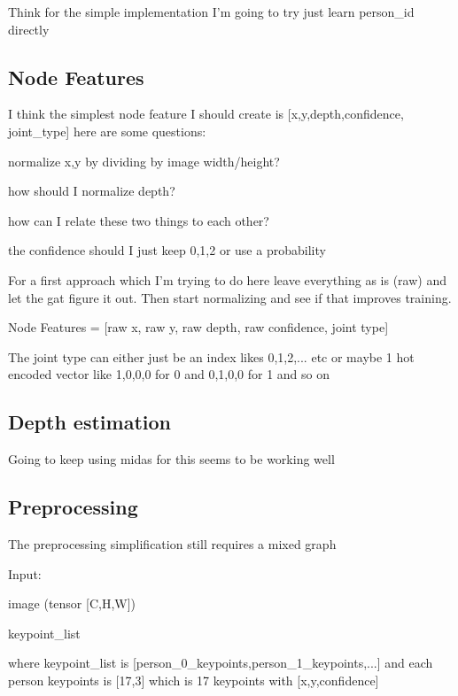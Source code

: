 Think for the simple implementation I'm going to try just learn person\_id directly

\subsection{Node Features}

I think the simplest node feature I should create is [x,y,depth,confidence, joint\_type] here are some questions:

\begin{compactitem}
	\item normalize x,y by dividing by image width/height?
	\item how should I normalize depth? 
	\item how can I relate these two things to each other? 
	\item the confidence should I just keep 0,1,2 or use a probability
\end{compactitem}

For a first approach which I'm trying to do here leave everything as is (raw) and let the gat figure it out.
Then start normalizing and see if that improves training.

Node Features = [raw x, raw y, raw depth, raw confidence, joint type]

The joint type can either just be an index likes 0,1,2,... etc or maybe 1 hot encoded vector like 1,0,0,0 for 0 and 0,1,0,0 for 1 and so on

\subsection{Depth estimation}

Going to keep using midas for this seems to be working well

\subsection{Preprocessing}

The preprocessing simplification still requires a mixed graph 

Input:

\begin{compactitem}
	\item image (tensor [C,H,W]) 
	\item keypoint\_list
\end{compactitem}

where keypoint\_list is [person\_0\_keypoints,person\_1\_keypoints,...] and each person keypoints is [17,3] which is 17 keypoints with [x,y,confidence]

